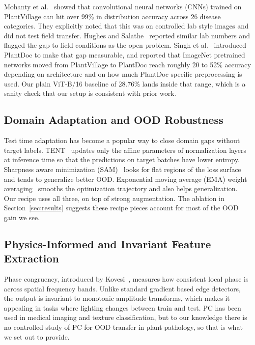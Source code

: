 \documentclass[conference]{IEEEtran}
\begin{document}
Mohanty et al.~\cite{Mohanty2016} showed that convolutional neural networks (CNNs) trained on PlantVillage can hit over 99\% in distribution accuracy across 26 disease categories. They explicitly noted that this was on controlled lab style images and did not test field transfer. Hughes and Salathe~\cite{Hughes2015} reported similar lab numbers and flagged the gap to field conditions as the open problem. Singh et al.~\cite{Singh2020} introduced PlantDoc to make that gap measurable, and reported that ImageNet pretrained networks moved from PlantVillage to PlantDoc reach roughly 20 to 52\% accuracy depending on architecture and on how much PlantDoc specific preprocessing is used. Our plain ViT-B/16 baseline of 28.76\% lands inside that range, which is a sanity check that our setup is consistent with prior work.

\subsection{Domain Adaptation and OOD Robustness}

Test time adaptation has become a popular way to close domain gaps without target labels. TENT~\cite{Wang2021} updates only the affine parameters of normalization layers at inference time so that the predictions on target batches have lower entropy. Sharpness aware minimization (SAM)~\cite{Foret2021} looks for flat regions of the loss surface and tends to generalize better OOD. Exponential moving average (EMA) weight averaging~\cite{Izmailov2018} smooths the optimization trajectory and also helps generalization. Our recipe uses all three, on top of strong augmentation. The ablation in Section~\ref{sec:results} suggests these recipe pieces account for most of the OOD gain we see.

\subsection{Physics-Informed and Invariant Feature Extraction}

Phase congruency, introduced by Kovesi~\cite{Kovesi1999}, measures how consistent local phase is across spatial frequency bands. Unlike standard gradient based edge detectors, the output is invariant to monotonic amplitude transforms, which makes it appealing in tasks where lighting changes between train and test. PC has been used in medical imaging and texture classification, but to our knowledge there is no controlled study of PC for OOD transfer in plant pathology, so that is what we set out to provide.
\end{document}
